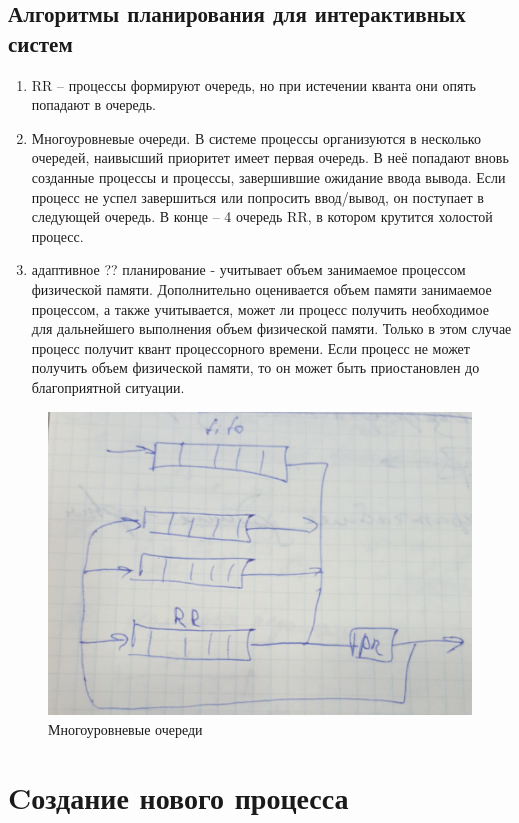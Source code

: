 \subsection{Алгоритмы планирования для интерактивных систем}
\begin{enumerate}
    \item RR – процессы формируют очередь, но при истечении кванта они опять попадают в очередь. 
    \item Многоуровневые очереди. В системе процессы организуются в несколько очередей, наивысший приоритет имеет первая очередь. В неё попадают вновь созданные процессы и процессы, завершившие ожидание ввода вывода.  Если процесс не успел завершиться или попросить ввод/вывод, он поступает в следующей очередь. В конце – 4 очередь RR, в котором крутится холостой процесс.
    \item  адаптивное ?? планирование - учитывает объем занимаемое процессом физической памяти. Дополнительно оценивается объем памяти занимаемое процессом, а также учитывается, может ли процесс получить необходимое для дальнейшего выполнения объем физической памяти. Только в этом случае процесс получит квант процессорного времени. Если процесс не может получить объем физической памяти, то он может быть приостановлен до благоприятной ситуации.
\end{enumerate}

\begin{figure}[H]
  \centering
  \includegraphics[width=\textwidth]{pic/1.png}
  \caption{Многоуровневые очереди}
\end{figure}

\section{Cоздание нового процесса}

